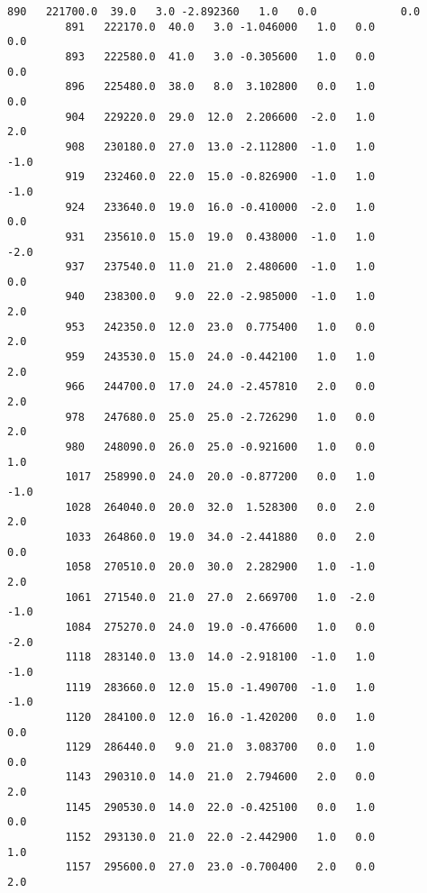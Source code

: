 \documentclass[11pt]{article}
\begin{document}
\begin{Verbatim}[commandchars=\\\{\}]
         890   221700.0  39.0   3.0 -2.892360   1.0   0.0             0.0   
         891   222170.0  40.0   3.0 -1.046000   1.0   0.0             0.0   
         893   222580.0  41.0   3.0 -0.305600   1.0   0.0             0.0   
         896   225480.0  38.0   8.0  3.102800   0.0   1.0             0.0   
         904   229220.0  29.0  12.0  2.206600  -2.0   1.0             2.0   
         908   230180.0  27.0  13.0 -2.112800  -1.0   1.0            -1.0   
         919   232460.0  22.0  15.0 -0.826900  -1.0   1.0            -1.0   
         924   233640.0  19.0  16.0 -0.410000  -2.0   1.0             0.0   
         931   235610.0  15.0  19.0  0.438000  -1.0   1.0            -2.0   
         937   237540.0  11.0  21.0  2.480600  -1.0   1.0             0.0   
         940   238300.0   9.0  22.0 -2.985000  -1.0   1.0             2.0   
         953   242350.0  12.0  23.0  0.775400   1.0   0.0             2.0   
         959   243530.0  15.0  24.0 -0.442100   1.0   1.0             2.0   
         966   244700.0  17.0  24.0 -2.457810   2.0   0.0             2.0   
         978   247680.0  25.0  25.0 -2.726290   1.0   0.0             2.0   
         980   248090.0  26.0  25.0 -0.921600   1.0   0.0             1.0   
         1017  258990.0  24.0  20.0 -0.877200   0.0   1.0            -1.0   
         1028  264040.0  20.0  32.0  1.528300   0.0   2.0             2.0   
         1033  264860.0  19.0  34.0 -2.441880   0.0   2.0             0.0   
         1058  270510.0  20.0  30.0  2.282900   1.0  -1.0             2.0   
         1061  271540.0  21.0  27.0  2.669700   1.0  -2.0            -1.0   
         1084  275270.0  24.0  19.0 -0.476600   1.0   0.0            -2.0   
         1118  283140.0  13.0  14.0 -2.918100  -1.0   1.0            -1.0   
         1119  283660.0  12.0  15.0 -1.490700  -1.0   1.0            -1.0   
         1120  284100.0  12.0  16.0 -1.420200   0.0   1.0             0.0   
         1129  286440.0   9.0  21.0  3.083700   0.0   1.0             0.0   
         1143  290310.0  14.0  21.0  2.794600   2.0   0.0             2.0   
         1145  290530.0  14.0  22.0 -0.425100   0.0   1.0             0.0   
         1152  293130.0  21.0  22.0 -2.442900   1.0   0.0             1.0   
         1157  295600.0  27.0  23.0 -0.700400   2.0   0.0             2.0   
         

\end{Verbatim}
\end{document}
